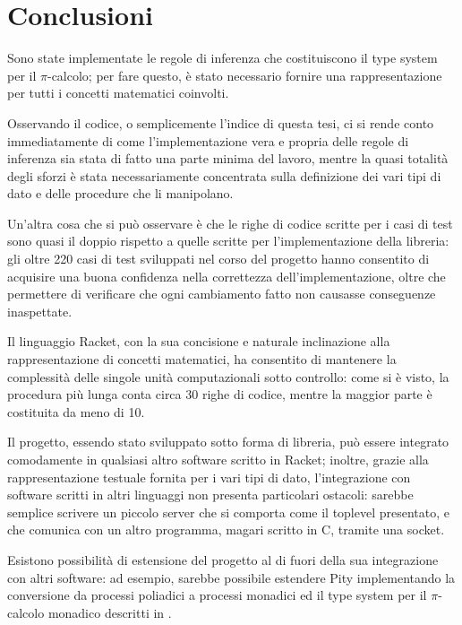 \section{Conclusioni}

Sono state implementate le regole di inferenza che costituiscono il
type system per il $\pi$-calcolo; per fare questo, \`e stato necessario
fornire una rappresentazione per tutti i concetti matematici coinvolti.

Osservando il codice, o semplicemente l'indice di questa tesi, ci si
rende conto immediatamente di come l'implementazione vera e propria
delle regole di inferenza sia stata di fatto una parte minima del lavoro,
mentre la quasi totalit\`a degli sforzi \`e stata necessariamente
concentrata sulla definizione dei vari tipi di dato e delle procedure
che li manipolano.

Un'altra cosa che si pu\`o osservare \`e che le righe di codice scritte
per i casi di test sono quasi il doppio rispetto a quelle scritte per
l'implementazione della libreria: gli oltre 220 casi di test sviluppati
nel corso del progetto hanno consentito di acquisire una buona confidenza
nella correttezza dell'implementazione, oltre che permettere di
verificare che ogni cambiamento fatto non causasse conseguenze
inaspettate.

Il linguaggio Racket, con la sua concisione e naturale inclinazione alla
rappresentazione di concetti matematici, ha consentito di mantenere la
complessit\`a delle singole unit\`a computazionali sotto controllo: come
si \`e visto, la procedura pi\`u lunga conta circa 30 righe di codice,
mentre la maggior parte \`e costituita da meno di 10.

Il progetto, essendo stato sviluppato sotto forma di libreria, pu\`o
essere integrato comodamente in qualsiasi altro software scritto in
Racket; inoltre, grazie alla rappresentazione testuale fornita per i
vari tipi di dato, l'integrazione con software scritti in altri linguaggi
non presenta particolari ostacoli: sarebbe semplice scrivere un piccolo
server che si comporta come il toplevel presentato, e che comunica con
un altro programma, magari scritto in C, tramite una socket.

Esistono possibilit\`a di estensione del progetto al di fuori della sua
integrazione con altri software: ad esempio, sarebbe possibile
estendere Pity implementando la conversione da processi poliadici a
processi monadici ed il type system per il $\pi$-calcolo monadico
descritti in \cite{qw05}.
